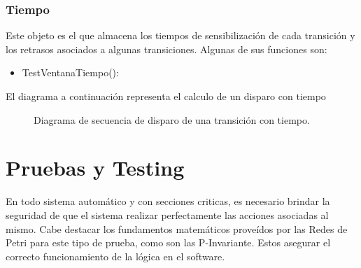 \documentclass[10pt, a4paper,notitlepage]{article}
\begin{document}
\subsubsection{Tiempo}
Este objeto es el que almacena los tiempos de sensibilización de cada transición y los retrasos asociados a algunas transiciones. Algunas de sus funciones son:
\begin{itemize}
	\item TestVentanaTiempo(): 
\end{itemize}
El diagrama a continuación representa el calculo de un disparo con tiempo
\begin{figure}[H] %
	\caption{Diagrama de secuencia de disparo de una transición con tiempo.}
	\label{fig:sec2}
\end{figure}

\section{Pruebas y Testing}
En todo sistema automático y con secciones criticas, es necesario brindar la seguridad de que el sistema realizar perfectamente las acciones asociadas al mismo.
Cabe destacar los fundamentos matemáticos proveídos por las Redes de Petri para este tipo de prueba, como son las P-Invariante. Estos asegurar el correcto funcionamiento de la lógica en el software.
\end{document}
